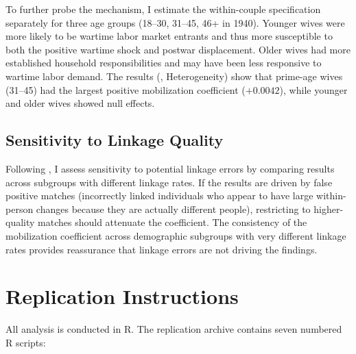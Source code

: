 \documentclass[12pt]{article}
\begin{document}
To further probe the mechanism, I estimate the within-couple specification separately for three age groups (18--30, 31--45, 46+ in 1940). Younger wives were more likely to be wartime labor market entrants and thus more susceptible to both the positive wartime shock and postwar displacement. Older wives had more established household responsibilities and may have been less responsive to wartime labor demand. The results (, Heterogeneity) show that prime-age wives (31--45) had the largest positive mobilization coefficient ($+0.0042$), while younger and older wives showed null effects.

\subsection{Sensitivity to Linkage Quality}

Following \citet{bailey2020howwell}, I assess sensitivity to potential linkage errors by comparing results across subgroups with different linkage rates. If the results are driven by false positive matches (incorrectly linked individuals who appear to have large within-person changes because they are actually different people), restricting to higher-quality matches should attenuate the coefficient. The consistency of the mobilization coefficient across demographic subgroups with very different linkage rates provides reassurance that linkage errors are not driving the findings.


\section{Replication Instructions}
\label{app:replication}

All analysis is conducted in R. The replication archive contains seven numbered R scripts:
\end{document}
